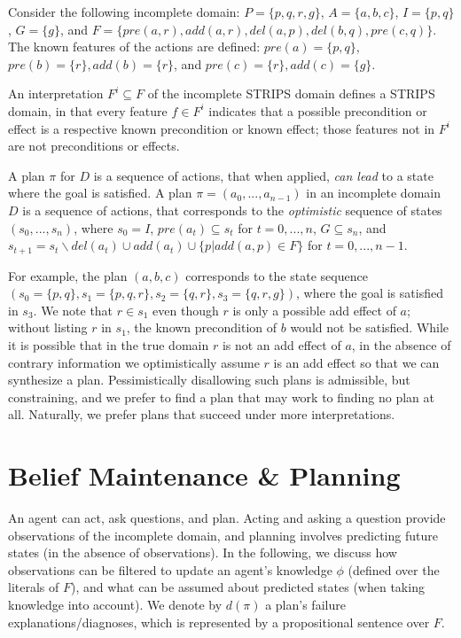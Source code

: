 \documentclass{article}
\begin{document}
Consider the following incomplete domain: $P = \{p, q, r, g\}$, ${A} =
\{{a}, {b}, {c}\}$, $I = \{p, q\}$,  $G= \{g\}$, and $F = \{pre(a, r), add(a, r),
del(a, p),del(b, q),pre(c, q) \}$.  The
known features of the actions are defined:  $pre({a}) = \{p, q\}$, $  pre({b}) =
\{r\},  add({b}) = \{r\}$, and  $ pre({c}) =
\{r\},  add({c}) = \{g\}$. 

An interpretation $F^i \subseteq F$ of the incomplete STRIPS domain
defines a STRIPS domain, in that every feature $f \in F^i$
indicates that a possible precondition or effect is a respective known
precondition or known effect; those features not in $F^i$ are
not preconditions or effects.   



 A plan $\pi$ for ${D}$ is a sequence of
actions, that when applied, {\em can lead} to a state where the goal is
satisfied.  A plan $\pi = ({a}_0,  ..., {a}_{n-1})$ in an incomplete
domain ${D}$ is a sequence of  actions, that corresponds to the {\em
optimistic} sequence of states $(s_0, ...,  s_n)$, where $s_0 = I$,
$pre({a}_t) \subseteq s_t$ for $t = 0,...,  n$, $G \subseteq s_n$,
and $s_{t+1} = s_t \backslash del({a}_t)  \cup
add({a}_t) \cup \{p | add(a, p) \in
F\}$ for $t = 0,...,
n-1$.

For example, the plan $({a}, {b}, {c})$ corresponds to the
state sequence $(s_0 = \{p, q\}, s_1 = \{p, q, r\}, s_2 = \{q, r\}, s_3 = \{q,
r, g\})$, where the goal is satisfied in $s_3$.  We note that $r \in s_1$ even
though $r$ is only a possible add effect of $a$; without listing $r$ in $s_1$,
the known precondition of $b$ would not be satisfied.  While it is possible that
in the true domain $r$ is not an add effect of $a$, in the absence of contrary
information we optimistically assume $r$ is an add effect so that we can
synthesize a plan.   Pessimistically disallowing such plans is admissible, but
constraining, and we prefer to find a plan that may work to finding no plan at
all.  Naturally, we prefer plans that succeed under more interpretations.

\section{Belief Maintenance \& Planning}

An agent can act, ask questions, and plan.  Acting and asking a question provide
observations of the incomplete domain, and planning involves predicting future
states (in the absence of observations).  In the following, we discuss how
observations can be filtered to update an agent's knowledge $\phi$ (defined over
the literals of $F$), and what can be assumed about predicted states
(when taking knowledge into account).  We denote by $d(\pi)$ a plan's failure
explanations/diagnoses, which is represented by a propositional sentence over
$F$.
\end{document}
